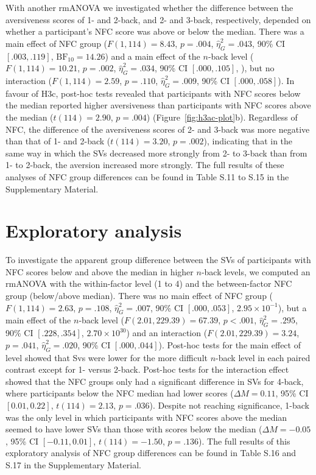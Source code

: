 \documentclass[
  man,floatsintext]{apa6}
\begin{document}
With another rmANOVA we investigated whether the difference between the aversiveness scores of 1- and 2-back, and 2- and 3-back, respectively, depended on whether a participant's NFC score was above or below the median.
There was a main effect of NFC group (\(F(1, 114) = 8.43\), \(p = .004\), \(\hat{\eta}^2_G = .043\), 90\% CI \([.003, .119]\), \(\mathrm{BF}_{\textrm{10}} = 14.26\)) and a main effect of the \(n\)-back level (\(F(1, 114) = 10.21\), \(p = .002\), \(\hat{\eta}^2_G = .034\), 90\% CI \([.000, .105]\), ), but no interaction (\(F(1, 114) = 2.59\), \(p = .110\), \(\hat{\eta}^2_G = .009\), 90\% CI \([.000, .058]\)).
In favour of H3c, post-hoc tests revealed that participants with NFC scores below the median reported higher aversiveness than participants with NFC scores above the median (\(t(114) = 2.90\), \(p = .004\)) (Figure~\ref{fig:h3ac-plot}b).
Regardless of NFC, the difference of the aversiveness scores of 2- and 3-back was more negative than that of 1- and 2-back (\(t(114) = 3.20\), \(p = .002\)), indicating that in the same way in which the SVs decreased more strongly from 2- to 3-back than from 1- to 2-back, the aversion increased more strongly.
The full results of these analyses of NFC group differences can be found in Table S.11 to S.15 in the Supplementary Material.

\hypertarget{exploratory-analysis}{%
\section{Exploratory analysis}\label{exploratory-analysis}}

To investigate the apparent group difference between the SVs of participants with NFC scores below and above the median in higher \(n\)-back levels, we computed an rmANOVA with the within-factor level (1 to 4) and the between-factor NFC group (below/above median).
There was no main effect of NFC group (\(F(1, 114) = 2.63\), \(p = .108\), \(\hat{\eta}^2_G = .007\), 90\% CI \([.000, .053]\), \(2.95 \times 10^{-1}\)), but a main effect of the \(n\)-back level (\(F(2.01, 229.39) = 67.39\), \(p < .001\), \(\hat{\eta}^2_G = .295\), 90\% CI \([.228, .354]\), \(2.70 \times 10^{30}\)) and an interaction (\(F(2.01, 229.39) = 3.24\), \(p = .041\), \(\hat{\eta}^2_G = .020\), 90\% CI \([.000, .044]\)).
Post-hoc tests for the main effect of level showed that Svs were lower for the more difficult \(n\)-back level in each paired contrast except for 1- versus 2-back.
Post-hoc tests for the interaction effect showed that the NFC groups only had a significant difference in SVs for 4-back, where participants below the NFC median had lower scores (\(\Delta M = 0.11\), 95\% CI \([0.01, 0.22]\), \(t(114) = 2.13\), \(p = .036\)).
Despite not reaching significance, 1-back was the only level in which participants with NFC scores above the median seemed to have lower SVs than those with scores below the median (\(\Delta M = -0.05\), 95\% CI \([-0.11, 0.01]\), \(t(114) = -1.50\), \(p = .136\)).
The full results of this exploratory analysis of NFC group differences can be found in Table S.16 and S.17 in the Supplementary Material.
\end{document}
